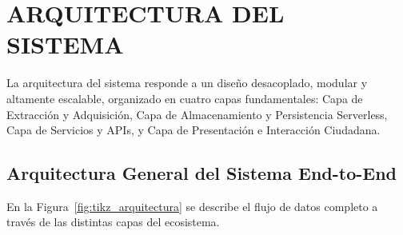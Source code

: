 \section{ARQUITECTURA DEL SISTEMA}

La arquitectura del sistema responde a un diseño desacoplado, modular y altamente escalable, organizado en cuatro capas fundamentales: Capa de Extracción y Adquisición, Capa de Almacenamiento y Persistencia Serverless, Capa de Servicios y APIs, y Capa de Presentación e Interacción Ciudadana.

\subsection{Arquitectura General del Sistema End-to-End}
En la Figura~\ref{fig:tikz_arquitectura} se describe el flujo de datos completo a través de las distintas capas del ecosistema.

